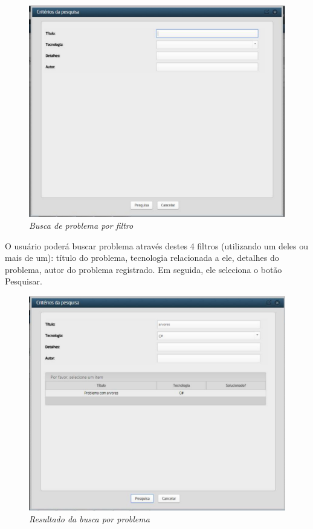 \begin{figure}[H]
\centering\includegraphics[scale=0.5]{figuras/buscaProblema.png}
\caption{\textit{Busca de problema por filtro}}
\end{figure}

O usuário poderá buscar problema através destes 4 filtros (utilizando um deles ou mais de um): título do problema, tecnologia relacionada a ele, detalhes do problema, autor do problema registrado. Em seguida, ele seleciona o botão Pesquisar. 

\begin{figure}[H]
\centering\includegraphics[scale=0.5]{figuras/resultadoBuscaProblema.png}
\caption{\textit{Resultado da busca por problema}}
\end{figure}

